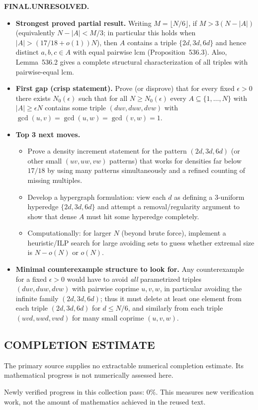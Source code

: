 \noindent\textbf{FINAL.}\;\textbf{UNRESOLVED.}
\begin{itemize}
\item[(i)] \textbf{Strongest proved partial result.} Writing $M=\lfloor N/6\rfloor$, if $M>3(N-|A|)$ (equivalently $N-|A|<M/3$; in particular this holds when $|A|>(17/18+o(1))N$), then $A$ contains a triple $\{2d,3d,6d\}$ and hence distinct $a,b,c\in A$ with equal pairwise lcm (Proposition~536.3). Also, Lemma~536.2 gives a complete structural characterization of all triples with pairwise-equal lcm.
\item[(ii)] \textbf{First gap (crisp statement).} Prove (or disprove) that for every fixed $\epsilon>0$ there exists $N_0(\epsilon)$ such that for all $N\ge N_0(\epsilon)$ every $A\subseteq\{1,\dots,N\}$ with $|A|\ge\epsilon N$ contains some triple $(d u v, d u w, d v w)$ with $\gcd(u,v)=\gcd(u,w)=\gcd(v,w)=1$.
\item[(iii)] \textbf{Top 3 next moves.}
  \begin{itemize}
  \item Prove a density increment statement for the pattern $(2d,3d,6d)$ (or other small $(uv,uw,vw)$ patterns) that works for densities far below $17/18$ by using many patterns simultaneously and a refined counting of missing multiples.
  \item Develop a hypergraph formulation: view each $d$ as defining a 3-uniform hyperedge $\{2d,3d,6d\}$ and attempt a removal/regularity argument to show that dense $A$ must hit some hyperedge completely.
  \item Computationally: for larger $N$ (beyond brute force), implement a heuristic/ILP search for large avoiding sets to guess whether extremal size is $N-o(N)$ or $o(N)$.
  \end{itemize}
\item[(iv)] \textbf{Minimal counterexample structure to look for.} Any counterexample for a fixed $\epsilon>0$ would have to avoid 
  \emph{all} parametrized triples $(d u v, d u w, d v w)$ with pairwise coprime $u,v,w$, in particular avoiding the infinite family $(2d,3d,6d)$; thus it must delete at least one element from each triple $(2d,3d,6d)$ for $d\le N/6$, and similarly from each triple $(uvd,uwd,vwd)$ for many small coprime $(u,v,w)$.
\end{itemize}




\subsection*{COMPLETION ESTIMATE}
The primary source supplies no extractable numerical completion estimate. Its mathematical progress is not numerically assessed here.

Newly verified progress in this collection pass: $0\%$. This measures new verification work, not the amount of mathematics achieved in the reused text.
